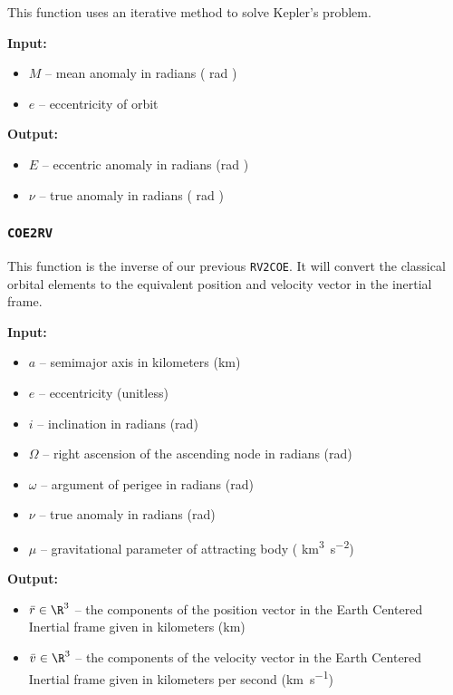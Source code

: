 \documentclass[11pt, reqno]{article}    %
\begin{document}
This function uses an iterative method to solve Kepler's problem.

\noindent\textbf{Input:}
    \begin{itemize}
        \item \( M \) -- mean anomaly in radians ( \si{\radian} )
        \item \( e \) -- eccentricity of orbit 
    \end{itemize}

\noindent \textbf{Output:}
\begin{itemize}
    \item \( E \) -- eccentric anomaly in radians (\si{\radian} )
    \item \( \nu \) -- true anomaly in radians ( \si{\radian} )
\end{itemize}

\subsubsection*{\texttt{COE2RV}}

This function is the inverse of our previous \texttt{RV2COE}.
It will convert the classical orbital elements to the equivalent position and velocity vector in the inertial frame.

\noindent\textbf{Input:}
\begin{itemize}
    \item \( a \)  -- semimajor axis in kilometers (\si{\kilo\meter})
    \item \( e \) -- eccentricity (unitless)
    \item \( i \) -- inclination in radians (\si{\radian})
    \item \( \Omega \) -- right ascension of the ascending node in radians (\si{\radian})
    \item \( \omega \) -- argument of perigee in radians (\si{\radian})
    \item \( \nu \) -- true anomaly in radians (\si{\radian})
    \item \( \mu \) -- gravitational parameter of attracting body ( \si{\kilo\meter\cubed\per\second\squared})
\end{itemize}

\noindent\textbf{Output:}
\begin{itemize}
    \item \( \bar r \in \R^{3} \) -- the components of the position vector in the Earth Centered Inertial frame given in kilometers (\si{\kilo\meter})
    \item \( \bar v \in \R^{3} \) -- the components of the velocity vector in the Earth Centered Inertial frame given in kilometers per second (\si{\kilo\meter\per\second})
\end{itemize}
\end{document}
